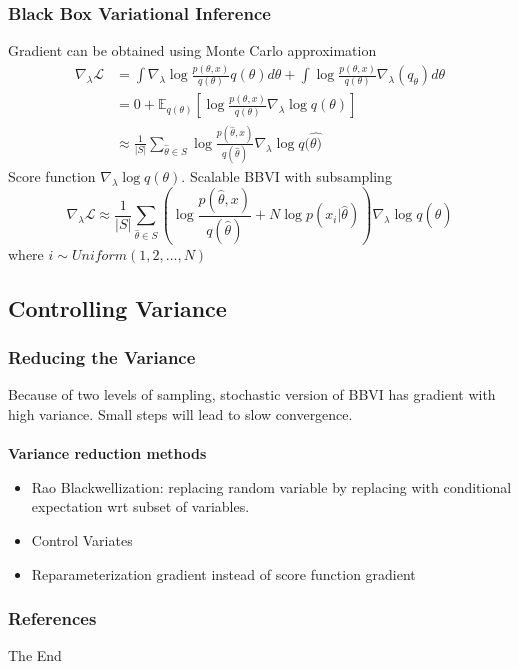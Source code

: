 \documentclass{beamer}
\newcommand{\E}{\mathbb{E}}
\renewcommand{\L}{\mathcal{L}}
\begin{document}

\begin{frame}
\frametitle{Black Box Variational Inference}
Gradient can be obtained using Monte Carlo approximation
\begin{align*}
\nabla_\lambda\L &= \int\nabla_\lambda \log\frac{p(\theta,x)}{q(\theta)} q(\theta) d\theta +\int \log\frac{p(\theta,x)}{q(\theta)}\nabla_\lambda(q_\theta) d\theta\\
&= 0+\E_{q(\theta)}\left[\log\frac{p(\theta,x)}{q(\theta)}\nabla_\lambda\log q(\theta)\right]\\
&\approx \frac{1}{|S|}\sum_{\hat{\theta}\in S}\log\frac{p(\hat\theta,x)}{q(\hat\theta)}\nabla_\lambda\log q(\hat{\theta)}
\end{align*}
Score function $\nabla_\lambda\log q(\theta)$. Scalable BBVI with subsampling
\begin{equation*}
\nabla_\lambda\L \approx \frac{1}{|S|}\sum_{\hat{\theta}\in S}\left(\log\frac{p(\hat\theta,x)}{q(\hat\theta)}+N\log p(x_i|\hat{\theta})\right)\nabla_\lambda\log q(\hat{\theta})
\end{equation*}
where $i \sim Uniform(1,2,\ldots,N)$
\end{frame}


\subsection{Controlling Variance}
\begin{frame}
\frametitle{Reducing the Variance}
Because of two levels of sampling, stochastic version of BBVI has gradient with high variance. Small steps will lead to slow convergence.\\~\\

\textbf{Variance reduction methods}
\begin{itemize}
\item Rao Blackwellization: replacing random variable by replacing with conditional expectation wrt subset of variables.
\item Control Variates
\item Reparameterization gradient instead of score function gradient
\end{itemize}
\end{frame}


\begin{frame}[allowframebreaks]
    \frametitle{References}
    \nocite{*}
    
    
\end{frame}


\begin{frame}
\Huge{\centerline{The End}}
\end{frame}

\end{document}
